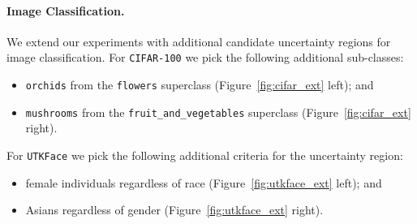 \paragraph{Image Classification.} We extend our experiments with additional candidate uncertainty regions for image classification. For \texttt{CIFAR-100} we pick the following additional sub-classes:
\begin{itemize}[noitemsep]
    \item \texttt{orchids} from the \texttt{flowers} superclass (Figure~\ref{fig:cifar_ext} left); and 
    \item \texttt{mushrooms} from the \texttt{fruit\_and\_vegetables} superclass (Figure~\ref{fig:cifar_ext} right).
\end{itemize}
For \texttt{UTKFace} we pick the following additional criteria for the uncertainty region:
\begin{itemize}[noitemsep]
    \item female individuals regardless of race (Figure~\ref{fig:utkface_ext} left); and
    \item Asians regardless of gender (Figure~\ref{fig:utkface_ext} right).
\end{itemize}

